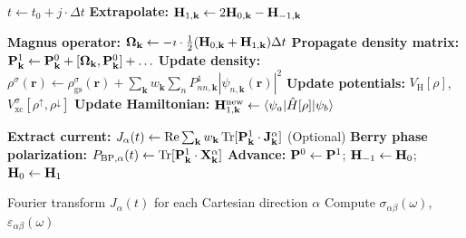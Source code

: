 \begin{algorithm}[h!]
\begin{algorithmic}[1]
\item[{\bf /* Time loop: */}]
  \State $t \leftarrow t_0 + j \cdot \Delta t$
  \State \textbf{Extrapolate:}
         $\vb{H}_{1,\mathbf{k}} \leftarrow 2\vb{H}_{0,\mathbf{k}}
          - \vb{H}_{-1,\mathbf{k}}$ 
  \item[]
  \item[{\bf /* Self-consistent Hamiltonian loop: */}]
    \State \textbf{Magnus operator:}
           $\vb{\Omega}_\mathbf{k} \leftarrow
            -\imath\cdot\tfrac{1}{2}(\vb{H}_{0,\mathbf{k}}
            + \vb{H}_{1,\mathbf{k}})\Delta t$
           \quad [magnus()]
    \State \textbf{Propagate density matrix:}
           $\vb{P}^1_\mathbf{k} \leftarrow
            \vb{P}^0_\mathbf{k} + [\vb{\Omega}_\mathbf{k}, \vb{P}^0_\mathbf{k}]
            + \ldots$ 
    \State \textbf{Update density:}
           $\rho^\sigma(\mathbf{r}) \leftarrow \rho^\sigma_{\mathrm{gs}}(\mathbf{r})
            + \sum_\mathbf{k} w_\mathbf{k}
              \sum_{n} P^1_{nn,\mathbf{k}} |\psi_{n,\mathbf{k}}(\mathbf{r})|^2$
    \State \textbf{Update potentials:}
           $V_{\mathrm{H}}[\rho]$, $V^\sigma_{\mathrm{xc}}[\rho^\uparrow,\rho^\downarrow]$
    \State \textbf{Update Hamiltonian:}
           $\vb{H}_{1,\mathbf{k}}^{\mathrm{new}} \leftarrow
            \langle\psi_a|\hat{H}[\rho]|\psi_b\rangle$
           \quad [HmatrixUpdate()]
  \EndWhile
  \item[]
  \State \textbf{Extract current:}
         $J_\alpha(t) \leftarrow
          \mathrm{Re}\sum_{\mathbf{k}} w_\mathbf{k}\,
          \mathrm{Tr}[\vb{P}^1_\mathbf{k}\cdot\vb{J}^\alpha_\mathbf{k}]$
  \State (Optional) \textbf{Berry phase polarization:}
         $P_{\mathrm{BP},\alpha}(t) \leftarrow
          \mathrm{Tr}[\vb{P}^1_\mathbf{k}\cdot\vb{X}^\alpha_\mathbf{k}]$
  \State \textbf{Advance:}
         $\vb{P}^0 \leftarrow \vb{P}^1$;\;
         $\vb{H}_{-1} \leftarrow \vb{H}_{0}$;\;
         $\vb{H}_{0} \leftarrow \vb{H}_{1}$
\EndFor
\item[]
\item[{\bf /* Postprocessing: */}]
\State Fourier transform $J_\alpha(t)$ for each Cartesian direction $\alpha$
\State Compute $\sigma_{\alpha\beta}(\omega)$,
       $\varepsilon_{\alpha\beta}(\omega)$

\end{algorithmic}
\end{algorithm}

